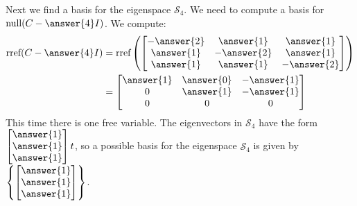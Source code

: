 \documentclass{ximera}
\begin{document}
\begin{example}
\begin{explanation}
    Next we find a basis for the eigenspace $\mathcal{S}_4$.  We need to compute a basis for $\mbox{null}(C-\answer{4}I)$.  We compute:
    \begin{align*}
    \mbox{rref}(C-\answer{4}I) &= \mbox{rref}\left(\begin{bmatrix} -\answer{2} & \answer{1} & \answer{1}\\ \answer{1} & -\answer{2} & \answer{1}\\ \answer{1} & \answer{1} & -\answer{2}\end{bmatrix}\right) \\
    &= \begin{bmatrix} \answer{1} & \answer{0} & -\answer{1}\\ 0 & \answer{1} & -\answer{1}\\ 0 & 0 & 0\end{bmatrix}
    \end{align*}
    This time there is one free variable. The eigenvectors in $\mathcal{S}_4$ have the form $\begin{bmatrix}\answer{1}\\\answer{1}\\\answer{1}\end{bmatrix}t$, so a possible basis for the eigenspace $\mathcal{S}_4$ is given by $\left\{\begin{bmatrix}\answer{1}\\\answer{1}\\\answer{1}\end{bmatrix}\right\}$.
    \end{explanation}
    \end{example}
    
\end{document}
